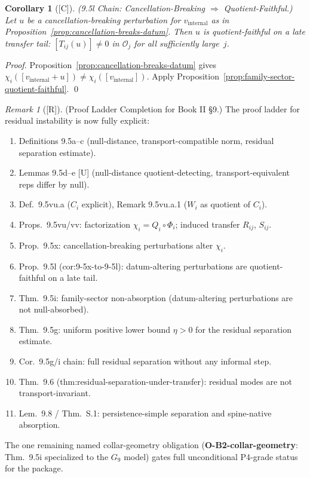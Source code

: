 \documentclass[12pt,oneside]{amsbook}
\theoremstyle{plain}
\newtheorem{corollary}[theorem]{Corollary}
\theoremstyle{definition}
\theoremstyle{remark}
\newtheorem{remark}[theorem]{Remark}
\newcommand{\status}[1]{\textup{[#1]}}
\begin{document}
\begin{corollary}[\status{C}]\label{cor:9-5x-to-9-5l}
\textup{(9.5l Chain: Cancellation-Breaking $\Rightarrow$ Quotient-Faithful.)}
Let $u$ be a cancellation-breaking perturbation for $v_{\mathrm{internal}}$
as in Proposition~\ref{prop:cancellation-breaks-datum}.  Then $u$ is
quotient-faithful on a late transfer tail:
$[T_{ij}(u)] \neq 0$ in $\mathcal{O}_j$ for all sufficiently large~$j$.
\end{corollary}

\begin{proof}
Proposition~\ref{prop:cancellation-breaks-datum} gives
$\chi_i([v_{\mathrm{internal}}+u]) \neq \chi_i([v_{\mathrm{internal}}])$.
Apply Proposition~\ref{prop:family-sector-quotient-faithful}. \qed
\end{proof}

\begin{remark}[\status{R}]\label{rem:9-5-stack-complete}
\textup{(Proof Ladder Completion for Book II §9.)}
The proof ladder for residual instability is now fully explicit:
\begin{enumerate}[label=\textup{(\arabic*)}]
  \item Definitions 9.5a--c (null-distance, transport-compatible norm,
    residual separation estimate).
  \item Lemmas 9.5d--e [U] (null-distance quotient-detecting,
    transport-equivalent reps differ by null).
  \item Def.~9.5vu.a ($C_i$ explicit), Remark 9.5vu.a.1 ($W_i$ as
    quotient of $C_i$).
  \item Props.~9.5vu/vv: factorization $\chi_i = Q_i \circ \Phi_i$;
    induced transfer $R_{ij}$, $S_{ij}$.
  \item Prop.~9.5x: cancellation-breaking perturbations alter $\chi_i$.
  \item Prop.~9.5l (cor:9-5x-to-9-5l): datum-altering perturbations are
    quotient-faithful on a late tail.
  \item Thm.~9.5i: family-sector non-absorption (datum-altering
    perturbations are not null-absorbed).
  \item Thm.~9.5g: uniform positive lower bound $\eta > 0$ for the
    residual separation estimate.
  \item Cor.~9.5g/i chain: full residual separation without any informal
    step.
  \item Thm.~9.6 (thm:residual-separation-under-transfer): residual
    modes are not transport-invariant.
  \item Lem.~9.8 / Thm.~S.1: persistence-simple separation and
    spine-native absorption.
\end{enumerate}
The one remaining named collar-geometry obligation
(\textbf{O-B2-collar-geometry}: Thm.~9.5i specialized to the $G_9$
model) gates full unconditional P4-grade status for the
package.
\end{remark}
\end{document}
